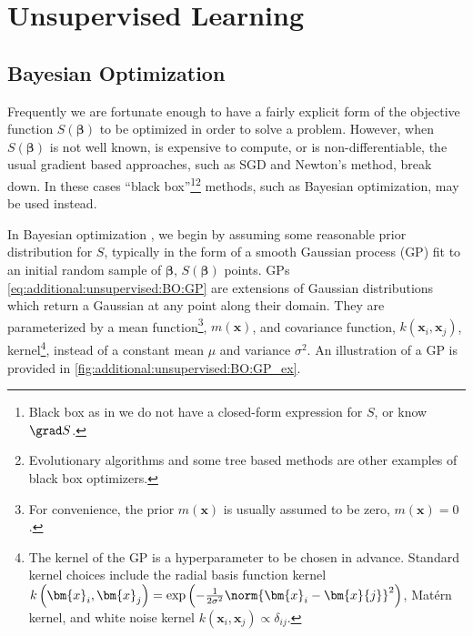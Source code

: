 \section{Unsupervised Learning}
\label{additional:unsupervised}

\subsection{Bayesian Optimization}
\label{additional:unsupervised:BO}

Frequently we are fortunate enough to have a fairly explicit form of
the objective function $S\left(\bm{\beta}\right)$ to be optimized in order to solve a problem.
However, when $S\left(\bm{\beta}\right)$ is not well known, is expensive to compute, or is non-differentiable,
the usual gradient based approaches, such as SGD and Newton's method, break down.
In these cases ``black box''\footnote{Black box as in
we do not have a closed-form expression for $S$, or know $\grad S$.}\footnote{Evolutionary algorithms
and some tree based methods \cite{Hutter2011,Hutter2014}
are other examples of black box optimizers.} methods,
such as Bayesian optimization, may be used instead.

In Bayesian optimization \cite{Brochu2010,1301.1942,Borisyak},
we begin by assuming some reasonable prior distribution for $S$,
typically in the form of a smooth Gaussian process (GP) fit
to an initial random sample of $\bm{\beta}$, $S\left(\bm{\beta}\right)$ points.
GPs \cref{eq:additional:unsupervised:BO:GP} are
extensions of Gaussian distributions which return a Gaussian at any point along their domain.
They are parameterized by a mean function\footnote{For convenience,
the prior $m\left(\bm{x}\right)$ is usually assumed to be zero, $m\left(\bm{x}\right)=0$.}, $m\left(\bm{x}\right)$,
and covariance function, $k\left(\bm{x}_{i}, \bm{x}_{j}\right)$,
\ie kernel\footnote{The kernel of the GP is a hyperparameter to be chosen in advance.
Standard kernel choices include
the radial basis function kernel $k\left(\bm{x}_{i}, \bm{x}_{j}\right) = \exp\left(-\frac{1}{2\sigma^{2}}\norm{\bm{x}_{i}-\bm{x}{j}}^{2}\right)$,
Mat\'{e}rn kernel,
and white noise kernel $k\left(\bm{x}_{i}, \bm{x}_{j}\right) \propto \delta_{ij}$.},
instead of a constant mean $\mu$ and variance $\sigma^{2}$.
An illustration of a GP is provided in \cref{fig:additional:unsupervised:BO:GP_ex}.

